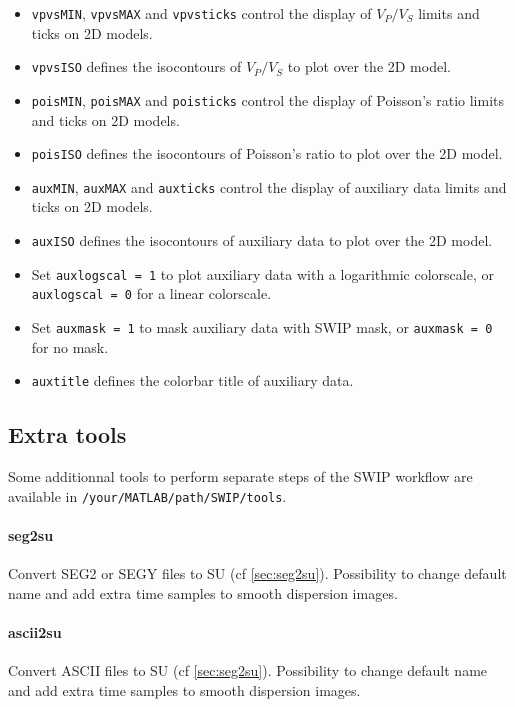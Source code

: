 \documentclass[twoside,a4paper]{article}
\begin{document}
\begin{itemize}[leftmargin=*]
\item \verb|vpvsMIN|, \verb|vpvsMAX| and \verb|vpvsticks| control the display of $V_P/V_S$ limits and ticks on 2D models.

\item \verb|vpvsISO| defines the isocontours of $V_P/V_S$ to plot over the 2D model.

\item \verb|poisMIN|, \verb|poisMAX| and \verb|poisticks| control the display of Poisson's ratio limits and ticks on 2D models.

\item \verb|poisISO| defines the isocontours of Poisson's ratio to plot over the 2D model.

\item \verb|auxMIN|, \verb|auxMAX| and \verb|auxticks| control the display of auxiliary data limits and ticks on 2D models.

\item \verb|auxISO| defines the isocontours of auxiliary data to plot over the 2D model.

\item Set \verb|auxlogscal = 1| to plot auxiliary data with a logarithmic colorscale, or \verb|auxlogscal = 0| for a linear colorscale.

\item Set \verb|auxmask = 1| to mask auxiliary data with SWIP mask, or \verb|auxmask = 0| for no mask.

\item \verb|auxtitle| defines the colorbar title of auxiliary data.

\end{itemize}

\clearpage
\subsection{Extra tools}
Some additionnal tools to perform separate steps of the SWIP workflow are available in \verb|/your/MATLAB/path/SWIP/tools|.
\paragraph{seg2su}
Convert SEG2 or SEGY files to SU (cf \ref{sec:seg2su}). Possibility to change default name and add extra time samples to smooth dispersion images.

\paragraph{ascii2su}
Convert ASCII files to SU (cf \ref{sec:seg2su}). Possibility to change default name and add extra time samples to smooth dispersion images.
\end{document}
